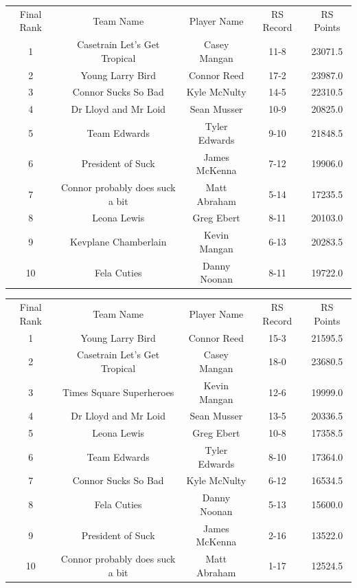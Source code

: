 \documentclass[11pt,letterpaper]{article}
\begin{document}
\newpage
{}
\vspace{-25pt}
\begin{table} [h]
\begin{center}
\begin{tabular} { c c c c c }
\\ Final Rank & Team Name & Player Name & RS Record & RS Points
\\ 1 & Casetrain Let's Get Tropical & Casey Mangan & 11-8 & 23071.5
\\ 2 & Young Larry Bird & Connor Reed & 17-2 & 23987.0
\\ 3 & Connor Sucks So Bad & Kyle McNulty & 14-5 & 22310.5
\\ 4 & Dr Lloyd and Mr Loid & Sean Musser & 10-9 & 20825.0
\\ 5 & Team Edwards & Tyler Edwards & 9-10 & 21848.5
\\ 6 & President of Suck & James McKenna & 7-12 & 19906.0
\\ 7 & Connor probably does suck a bit & Matt Abraham & 5-14 & 17235.5
\\ 8 & Leona Lewis & Greg Ebert & 8-11 & 20103.0
\\ 9 & Kevplane Chamberlain & Kevin Mangan & 6-13 & 20283.5
\\ 10 & Fela Cuties & Danny Noonan & 8-11 & 19722.0
\end{tabular}
\end{center}
\end{table}

\vspace{-25pt}
\begin{table} [h]
\begin{center}
\begin{tabular} { c c c c c }
\\ Final Rank & Team Name & Player Name & RS Record & RS Points
\\ 1 & Young Larry Bird & Connor Reed & 15-3 & 21595.5
\\ 2 & Casetrain Let's Get Tropical & Casey Mangan & 18-0 & 23680.5
\\ 3 & Times Square Superheroes & Kevin Mangan & 12-6 & 19999.0
\\ 4 & Dr Lloyd and Mr Loid & Sean Musser & 13-5 & 20336.5
\\ 5 & Leona Lewis & Greg Ebert & 10-8 & 17358.5
\\ 6 & Team Edwards & Tyler Edwards & 8-10 & 17364.0
\\ 7 & Connor Sucks So Bad & Kyle McNulty & 6-12 & 16534.5
\\ 8 & Fela Cuties & Danny Noonan & 5-13 & 15600.0
\\ 9 & President of Suck & James McKenna & 2-16 & 13522.0
\\ 10 & Connor probably does suck a bit & Matt Abraham & 1-17 & 12524.5
\end{tabular}
\end{center}
\end{table}
\end{document}
